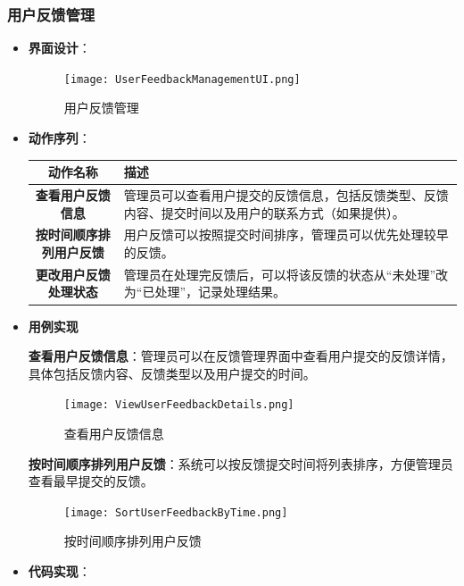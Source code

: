 \subsubsection{用户反馈管理}

\begin{itemize}
	\item \textbf{界面设计}：
	\begin{figure}[H]
		\centering
		\texttt{[image: UserFeedbackManagementUI.png]}
		\caption{用户反馈管理}
	\end{figure}
	\item \textbf{动作序列}：
	\begin{table}[H]
		\centering
		\renewcommand\arraystretch{1.5}
		\begin{tabular}{|c|>{\raggedright\arraybackslash}p{10cm}|}
			\hline
			\textbf{动作名称} & \textbf{描述} \\ \hline
			\textbf{查看用户反馈信息} & 管理员可以查看用户提交的反馈信息，包括反馈类型、反馈内容、提交时间以及用户的联系方式（如果提供）。\\ \hline
			\textbf{按时间顺序排列用户反馈} & 用户反馈可以按照提交时间排序，管理员可以优先处理较早的反馈。\\ \hline
			\textbf{更改用户反馈处理状态} & 管理员在处理完反馈后，可以将该反馈的状态从“未处理”改为“已处理”，记录处理结果。\\ \hline
		\end{tabular}
	\end{table}
	
	\item \textbf{用例实现}
	
	\textbf{查看用户反馈信息}：管理员可以在反馈管理界面中查看用户提交的反馈详情，具体包括反馈内容、反馈类型以及用户提交的时间。
	
	\begin{figure}[H]
		\centering
		\texttt{[image: ViewUserFeedbackDetails.png]}
		\caption{查看用户反馈信息}
	\end{figure}
	
	\textbf{按时间顺序排列用户反馈}：系统可以按反馈提交时间将列表排序，方便管理员查看最早提交的反馈。
	
	\begin{figure}[H]
		\centering
		\texttt{[image: SortUserFeedbackByTime.png]}
		\caption{按时间顺序排列用户反馈}
	\end{figure}
	
	\item \textbf{代码实现}：
	
\end{itemize}

